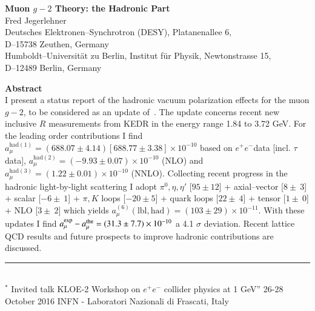 \documentclass[epj,onecolumn]{webofc}
\newcommand{\epm}{e^+e^- }
\newcommand{\power}[1]{\times 10^{#1} }
\newcommand{\amu}{a_\mu }
\begin{document}
\begin{center}
{\large\bf
Muon $g-2$ Theory: the Hadronic Part}\\
{Fred Jegerlehner}\\
{Deutsches  Elektronen--Synchrotron (DESY), Platanenallee 6,\\ D--15738 Zeuthen, Germany\\
Humboldt--Universit\"at zu Berlin, Institut f\"ur Physik, Newtonstrasse 15,\\ D--12489 Berlin,
Germany}

\vfill


\begin{minipage}{0.8\textwidth}
{\bf Abstract}\\
I present a status report of the hadronic vacuum polarization effects
for the muon $g-2$, to be considered as an update
of~\cite{Jegerlehner:2015stw}. The update concerns recent new
inclusive $R$ measurements from KEDR in the energy range 1.84 to 3.72
GeV. For the leading order contributions I find
$\amu^{\mathrm{had}(1)}=(688.07\pm 4.14)[688.77\pm3.38]\times
10^{-10}$ based on $\epm$data [incl. $\tau$ data],
$\amu^{\mathrm{had}(2)}= (-9.93\pm 0.07) \times 10^{-10}$ (NLO) and
$\amu^{\mathrm{had}(3)}= (1.22\pm 0.01) \times 10^{-10}$ (NNLO).
Collecting recent progress in the hadronic light-by-light scattering
I adopt $\pi^0,\eta,\eta'$ [$95 \pm 12$] + axial--vector [$8 \pm
~3$] + scalar [$-6\pm ~1$] + $\pi,K$ loops [$-20\pm 5$] + quark loops
[$22\pm ~4$] + tensor [$1\pm ~0$] + NLO [$3\pm ~2$] which yields
$ a^{(6)}_\mu(\mathrm{lbl},\mathrm{had})=(103 \pm 29) \power{-11}.$
With these  updates I find
$a_\mu^{\rm exp}-a_\mu^{\rm the}=(31.3\pm 7.7)\times 10^{-10}$ a 4.1
$\sigma$ deviation. Recent lattice QCD results and future prospects
to improve hadronic contributions are discussed.
\end{minipage}
\end{center}
\vfill
\noindent\rule{8cm}{0.5pt}\\
$^*$ Invited talk
 KLOE-2 Workshop on $e^+e^-$ collider physics at 1 GeV''
26-28 October 2016 INFN - Laboratori Nazionali di Frascati, Italy
\setcounter{page}{0}
\newpage

\maketitle
%
\end{document}
